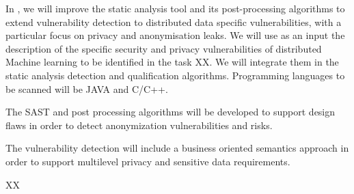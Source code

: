 \begin{Workpackage}{\thewpno}
 
\begin{Task}
\TaskResults{%
}
\TaskHeader{}
In \theTask, we will improve the static analysis tool and its post-processing algorithms to extend vulnerability detection to distributed data specific vulnerabilities, with a particular focus on privacy and anonymisation leaks. We will use as an input the description of the specific security and privacy vulnerabilities of distributed Machine learning to be identified in the task XX. We will integrate them in the static analysis detection and qualification algorithms. Programming languages to be scanned will be JAVA and C/C++.

The SAST and post processing algorithms will be developed to support design flaws in order to detect anonymization vulnerabilities and risks.

The vulnerability detection will include a business oriented semantics approach in order to support multilevel privacy and sensitive data requirements.

\end{Task}

 
 






\begin{WPDeliverables}
  \begin{compactitem}
    \item XX
\end{compactitem}
\end{WPDeliverables}
\end{Workpackage}
